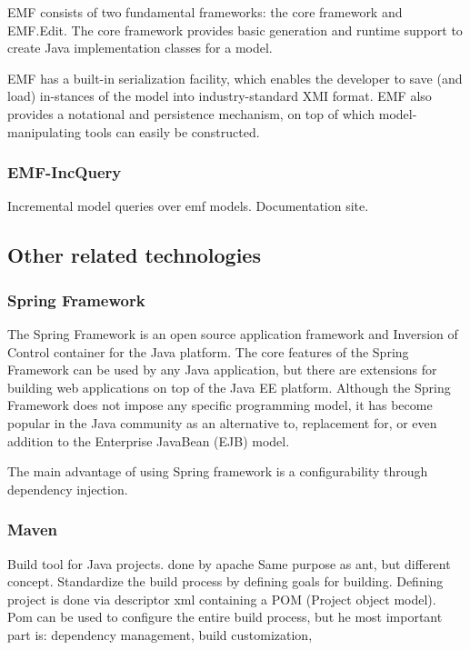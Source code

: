 EMF consists of two fundamental frameworks: the core framework and EMF.Edit. The
core framework provides basic generation and runtime support to create Java
implementation classes for a model.

EMF has a built-in serialization facility, which enables the developer to save
(and load) in-stances of the model into industry-standard XMI format. EMF also
provides a notational and persistence mechanism, on top of which
model-manipulating tools can easily be constructed.


\subsubsection{EMF-IncQuery} 
Incremental model queries over emf models. Documentation site.

\subsection{Other related technologies}

\subsubsection{Spring Framework}
%
The Spring Framework is an open source application framework and Inversion of
Control container for the Java platform. The core features of the Spring
Framework can be used by any Java application, but there are extensions for
building web applications on top of the Java EE platform. Although the Spring
Framework does not impose any specific programming model, it has become popular
in the Java community as an alternative to, replacement for, or even addition to
the Enterprise JavaBean (EJB) model.

%
The main advantage of using Spring framework is a configurability through
dependency injection. 


\subsubsection{Maven}
Build tool for Java projects. done by apache Same purpose as ant, but different
concept.
Standardize the build process by defining goals for building.
Defining project is done via descriptor xml containing a POM (Project object
model).
Pom can be used to configure the entire build process, but he most important part
is: dependency management, build customization,

